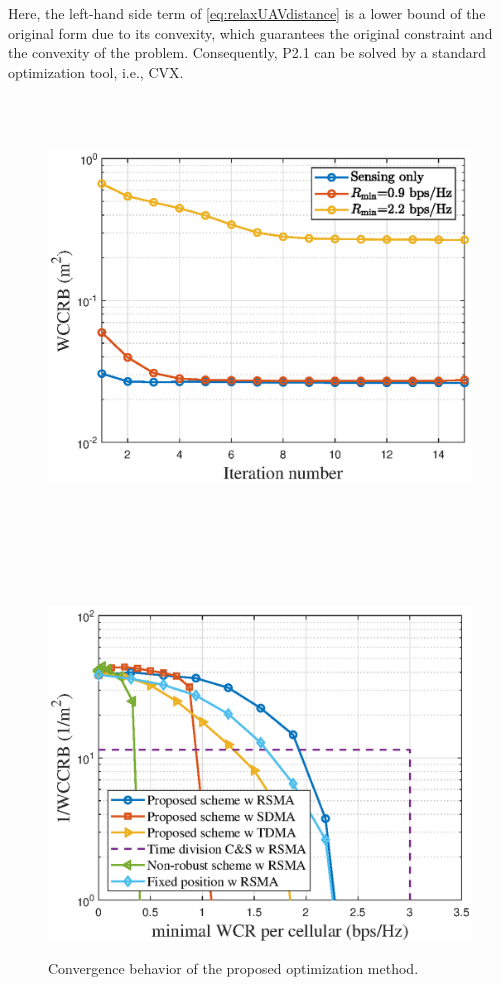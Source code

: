 \documentclass[twocolumn,journal]{IEEEtran}
\begin{document}
Here, the left-hand side term of \eqref{eq:relaxUAVdistance} is a lower bound of the original form due to its convexity, which guarantees the original constraint and the convexity of the problem. Consequently, P2.1 can be solved by a standard optimization tool, i.e., CVX.
\begin{figure}[t]
  \centering
  \begin{minipage}{0.3\textwidth}
    \centering
    \includegraphics[width=\linewidth]{figure/1_figConv.eps}
    \caption{Convergence behavior of the proposed optimization method.}
    \label{fig:Conv}
  \end{minipage}
  \hfill
  \begin{minipage}{0.3\textwidth}
    \centering
    \includegraphics[width=\linewidth]{figure/2_figRate_CRB.eps}

\end{minipage}
\end{figure}
\end{document}
